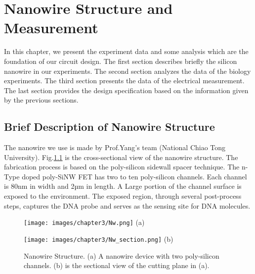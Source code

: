 \chapter{Nanowire Structure and Measurement}
In this chapter, we present the experiment data and some analysis which are the foundation of our circuit design.
The first section describes briefly the silicon nanowire in our experiments.
The second section analyzes the data of the biology experiments.
The third section presents the data of the electrical measurement.
The last section provides the design specification based on the information given by the previous sections.

\section{Brief Description of Nanowire Structure}
The nanowire we use is made by Prof.Yang's team (National Chiao Tong University)\cite{C5}.
Fig.\ref{fig:drawing} is the cross-sectional view of the nanowire structure.
The fabrication process is based on the poly-silicon sidewall spacer technique.
The n-Type doped poly-SiNW FET has two to ten poly-silicon channels.
Each channel is 80nm in width and 2µm in length.
A Large portion of the channel surface is exposed to the environment.
The exposed region, through several post-process steps, captures the DNA probe and serves as the sensing site for DNA molecules.\cite{C5, C6}


\begin{figure}[!htbp]
    \centering
    \begin{minipage}[t]{0.4\textwidth}
        \texttt{[image: images/chapter3/Nw.png]}
        \raggedleft
        (a)
    \end{minipage}
    \hfill
    \begin{minipage}[t]{0.4\textwidth}
        \texttt{[image: images/chapter3/Nw\_section.png]}
        \raggedleft
        (b)
    \end{minipage}
    \caption{Nanowire Structure.  (a) A nanowire device with two poly-silicon channels. (b) is the sectional view of the cutting plane in (a). }
    \label{fig:drawing}
\end{figure}


